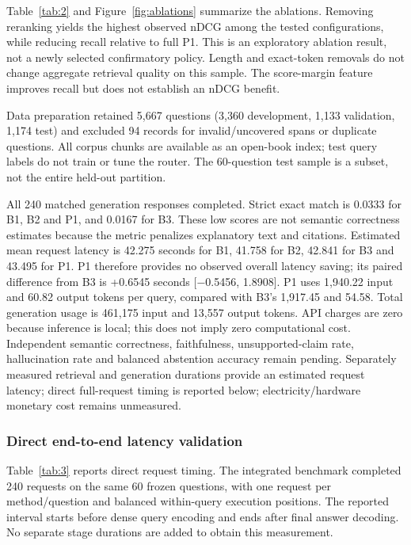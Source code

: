 \documentclass[10pt,a4paper]{article}
\begin{document}
Table~\ref{tab:2} and Figure~\ref{fig:ablations} summarize the ablations. Removing reranking yields the highest observed nDCG among the tested
configurations, while reducing recall relative to full P1. This is an
exploratory ablation result, not a newly selected confirmatory policy.
Length and exact-token removals do not change aggregate retrieval
quality on this sample. The score-margin feature improves recall but
does not establish an nDCG benefit.

Data preparation retained 5,667 questions (3,360 development, 1,133
validation, 1,174 test) and excluded 94 records for invalid/uncovered
spans or duplicate questions. All corpus chunks are available as an
open-book index; test query labels do not train or tune the router. The
60-question test sample is a subset, not the entire held-out partition.

All 240 matched generation responses completed. Strict exact match is
0.0333 for B1, B2 and P1, and 0.0167 for B3. These low scores are not
semantic correctness estimates because the metric penalizes explanatory
text and citations. Estimated mean request latency is 42.275 seconds for
B1, 41.758 for B2, 42.841 for B3 and 43.495 for P1. P1 therefore
provides no observed overall latency saving; its paired difference from
B3 is +0.6545 seconds {[}−0.5456, 1.8908{]}. P1 uses 1,940.22 input and
60.82 output tokens per query, compared with B3's 1,917.45 and 54.58.
Total generation usage is 461,175 input and 13,557 output tokens. API
charges are zero because inference is local; this does not imply zero
computational cost. Independent semantic correctness, faithfulness,
unsupported-claim rate, hallucination rate and balanced abstention
accuracy remain pending. Separately measured retrieval and generation
durations provide an estimated request latency; direct full-request
timing is reported below; electricity/hardware monetary cost remains
unmeasured.

\hypertarget{direct-end-to-end-latency-validation}{%
\subsubsection{Direct end-to-end latency
validation}\label{direct-end-to-end-latency-validation}}

Table~\ref{tab:3} reports direct request timing. The integrated benchmark completed 240 requests on the same 60 frozen
questions, with one request per method/question and balanced
within-query execution positions. The reported interval starts before
dense query encoding and ends after final answer decoding. No separate
stage durations are added to obtain this measurement.
\end{document}
